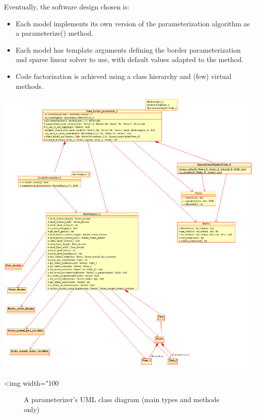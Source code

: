 Eventually, the software design chosen is:
\begin{itemize}
\item Each  model implements its own version
      of the parameterization algorithm as a parameterize() method.
\item Each  model has template arguments
      defining the border parameterization and sparse linear solver to use,
      with default values adapted to the method.
\item Code factorization is achieved using a class hierarchy and (few) virtual methods.
\end{itemize}

\begin{center}
    \label{Surface_mesh_parameterization-fig-parameterizer_class_diagram}
    \begin{ccTexOnly}
        \includegraphics[width=1.1\textwidth]{Surface_mesh_parameterization/parameterizer_class_diagram}
    \end{ccTexOnly}
    \begin{ccHtmlOnly}
        <img width="100%
    \end{ccHtmlOnly}
    \begin{figure}[h]
        \caption{A parameterizer's UML class diagram (main types and methods only)}
    \end{figure}
\end{center}


